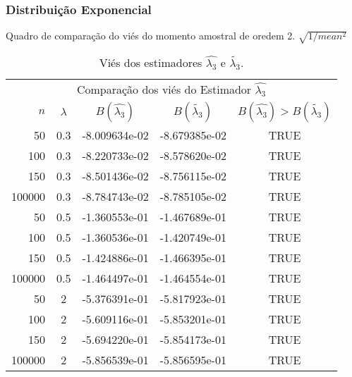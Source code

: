 \begin{frame}
\frametitle{Distribuição Exponencial}
Quadro de comparação do viés do momento amostral de oredem 2. $\sqrt{1/mean^2}$

\begin{table}[H]
\caption{Viés dos estimadores $\hat{\lambda_{3}}$ e $\tilde{\lambda_{3}}$.}
\label{tab:p1Vies}
\tiny
\centering
\begin{tabular}{rcccc}
\toprule
\multicolumn{5}{c}{Comparação dos viés do Estimador $\hat{\lambda_{3}}$}\\
$n$ & $\lambda$ & $B(\hat{\lambda_{3}})$ & $B(\tilde{\lambda_{3}})$ & $B(\hat{\lambda_{3}})>B(\tilde{\lambda_{3}})$ \\
\midrule
50 & 0.3 & -8.009634e-02 & -8.679385e-02  & TRUE \\
100 & 0.3 & -8.220733e-02 & -8.578620e-02 & TRUE \\
150 & 0.3 & -8.501436e-02 & -8.756115e-02 & TRUE \\
100000 & 0.3 & -8.784743e-02 & -8.785105e-02 & TRUE \\
\midrule
50 & 0.5 & -1.360553e-01 & -1.467689e-01  & TRUE \\
100 & 0.5 &  -1.360536e-01 & -1.420749e-01 & TRUE \\
150 & 0.5 &  -1.424886e-01  & -1.466395e-01 & TRUE\\
100000 & 0.5 & -1.464497e-01 & -1.464554e-01 & TRUE \\
\midrule
50 & 2 & -5.376391e-01 &  -5.817923e-01 & TRUE \\
100 & 2 & -5.609116e-01 & -5.853201e-01 & TRUE \\
150 & 2 & -5.694220e-01 & -5.854173e-01 & TRUE \\
100000 & 2 & -5.856539e-01 & -5.856595e-01 & TRUE \\
\bottomrule
\end{tabular}
\end{table}
\end{frame}


